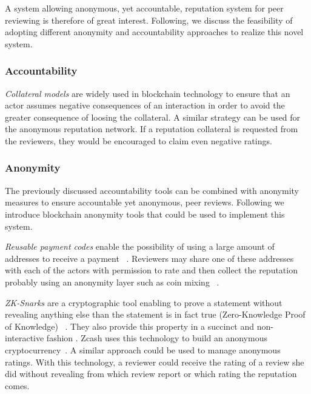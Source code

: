 A system allowing anonymous, yet accountable, reputation system for peer
reviewing is therefore of great interest. Following, we discuss the feasibility
of adopting different anonymity and accountability approaches to realize this
novel system.

\subsubsection*{Accountability}

\emph{Collateral models} are widely used in blockchain technology to ensure that
an actor assumes negative consequences of an interaction in order to avoid the
greater consequence of loosing the collateral. A similar strategy can be used
for the anonymous reputation network. If a reputation collateral is requested
from the reviewers, they would be encouraged to claim even negative ratings.

\subsubsection*{Anonymity}


The previously discussed accountability tools can be combined with anonymity
measures to ensure accountable yet anonymous, peer reviews. Following we
introduce blockchain anonymity tools that could be used to implement this
system.

\emph{Reusable payment codes} enable the possibility of using a large amount of
addresses to receive a payment ~\cite{harrigan2016unreasonable,
  ranvierReusable}. Reviewers may share one of these addresses with each of the
actors with permission to rate and then collect the reputation probably using an
anonymity layer such as coin mixing ~\cite{meiklejohn2015privacy}.

\emph{ZK-Snarks} are a cryptographic tool enabling to prove a statement without
revealing anything else than the statement is in fact true (Zero-Knowledge Proof
of Knowledge) ~\cite{blum1988non,bitansky2013succinct}. They also provide this
property in a succinct and non-interactive fashion . Zcash uses this technology to build an anonymous
cryptocurrency~\cite{sasson2014zerocash}. A similar approach could be used to
manage anonymous ratings. With this technology, a reviewer could receive the
rating of a review she did without revealing from which review report or which
rating the reputation comes.
